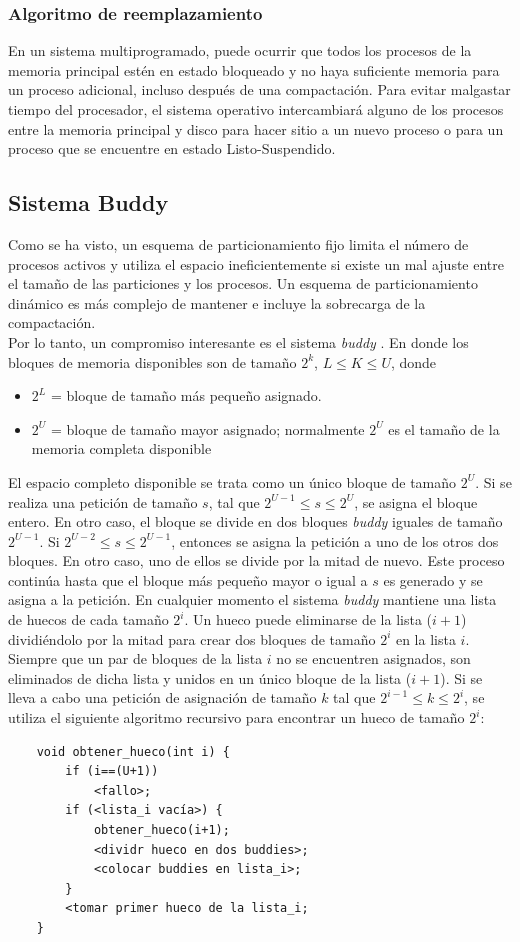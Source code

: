\documentclass[12pt,a4paper]{article}
\begin{document}
\subsubsection{Algoritmo de reemplazamiento}
En un sistema multiprogramado, puede ocurrir que todos los procesos de la memoria principal estén en estado bloqueado y no haya suficiente memoria para un proceso adicional, incluso después de una compactación. Para evitar malgastar tiempo del procesador, el sistema operativo intercambiará alguno de los procesos entre la memoria principal y disco para hacer sitio a un nuevo proceso o para un proceso que se encuentre en estado Listo-Suspendido.
\subsection{Sistema Buddy}
Como se ha visto, un esquema de particionamiento fijo limita el número de procesos activos y utiliza el espacio ineficientemente si existe un mal ajuste entre el tamaño de las particiones y los procesos. Un esquema de particionamiento dinámico es más complejo de mantener e incluye la sobrecarga de la compactación. \\ 
Por lo tanto, un compromiso interesante es el sistema \textit{buddy} . En donde los bloques de memoria disponibles son de tamaño $2^k$, $L \leq K \leq U$, donde
\begin{itemize}
    \item $2^L$ = bloque de tamaño más pequeño asignado.
    \item $2^U$ = bloque de tamaño mayor asignado; normalmente $2^U$ es el tamaño de la memoria completa disponible
\end{itemize}
El espacio completo disponible se trata como un único bloque de tamaño $2^U$. Si se realiza una petición de tamaño $s$, tal que $2^{U-1}\le s \leq 2^U$, se asigna el bloque entero. En otro caso, el bloque se divide en dos bloques \textit{buddy} iguales de tamaño $2^{U-1}$. Si $2^{U-2}\le s \leq 2^{U-1}$, entonces se asigna la petición a uno de los otros dos bloques. En otro caso, uno de ellos se divide por la mitad de nuevo. Este proceso continúa hasta que el bloque más pequeño mayor o igual a $s$ es generado y se asigna a la petición. En cualquier momento el sistema \textit{buddy} mantiene una lista de huecos de cada tamaño $2^i$. Un hueco puede eliminarse de la lista ($i+1$) dividiéndolo por la mitad para crear dos bloques de tamaño $2^i$ en la lista $i$. Siempre que un par de bloques de la lista $i$ no se encuentren asignados, son eliminados de dicha lista y unidos en un único bloque de la lista ($i+1$). Si se lleva a cabo una petición de asignación de tamaño $k$ tal que $2^{i-1}\le k \leq 2^i$, se utiliza el siguiente algoritmo recursivo para encontrar un hueco de tamaño $2^i$:
\begin{verbatim}
    void obtener_hueco(int i) {
        if (i==(U+1))
            <fallo>;
        if (<lista_i vacía>) {
            obtener_hueco(i+1);
            <dividr hueco en dos buddies>;
            <colocar buddies en lista_i>;
        }
        <tomar primer hueco de la lista_i;
    }
\end{verbatim}
\end{document}
